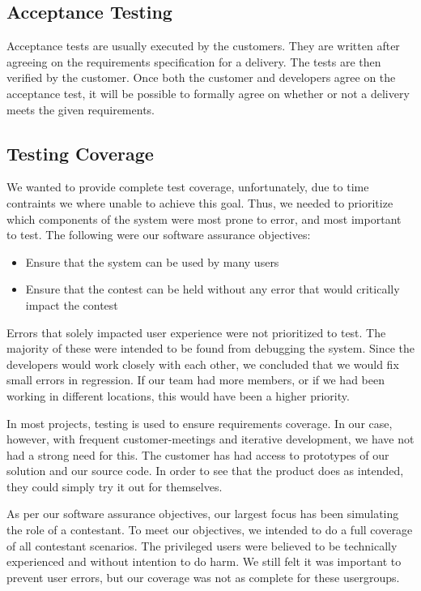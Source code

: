 \subsection{Acceptance Testing}
Acceptance tests are usually executed by the customers. They are written
after agreeing on the requirements specification for a delivery. The
tests are then verified by the customer. Once both the customer and
developers agree on the acceptance test, it will be possible to
formally agree on whether or not a delivery meets the given
requirements.

\subsection{Testing Coverage}
We wanted to provide complete test coverage, unfortunately, due to time contraints we where unable 
to achieve this goal. Thus, we needed to prioritize which components of the system were
most prone to error, and most important to test. The following were our
software assurance objectives:
\begin{itemize}
    \item Ensure that the system can be used by many users
    \item Ensure that the contest can be held without any error that would
critically impact the contest
\end{itemize}

Errors that solely impacted user experience were not prioritized to
test. The majority of these were intended to be found from debugging
the system. Since the developers would work closely with each other, 
we concluded that we would fix small errors in regression.
If our team had more members, or if we had been working in different
locations, this would have been a higher priority.

In most projects, testing is used to ensure requirements coverage. In
our case, however, with frequent customer-meetings and iterative
development, we have not had a strong need for this. The customer has
had access to prototypes of our solution and our source code. In order
to see that the product does as intended, they could simply try it out
for themselves.

As per our software assurance objectives, our largest focus has been
simulating the role of a contestant. To meet our objectives, we
intended to do a full coverage of all contestant scenarios. The
privileged users were believed to be technically experienced and
without intention to do harm. We still felt it was important to prevent
user errors, but our coverage was not as complete for these
usergroups.

